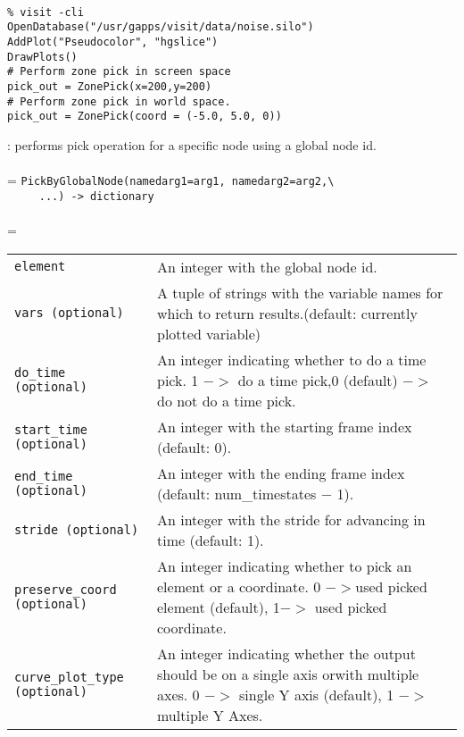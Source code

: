\documentclass[10pt,a4paper]{report}
\begin{document}
\\[-6mm]
\begin{verbatim}% visit -cli
OpenDatabase("/usr/gapps/visit/data/noise.silo")
AddPlot("Pseudocolor", "hgslice")
DrawPlots()
# Perform zone pick in screen space
pick_out = ZonePick(x=200,y=200)
# Perform zone pick in world space.
pick_out = ZonePick(coord = (-5.0, 5.0, 0))
\end{verbatim}
\newpage


{}
: performs pick operation for a specific node using a global node id.\\[-3mm]

 \\ 
\hangindent=\parindent
\verb!PickByGlobalNode(namedarg1=arg1, namedarg2=arg2,\ ! \\ 
\verb!     ...) -> dictionary!\\ [-3mm]

 \\ 
\hangindent=\parindent 
\begin{tabular}{lp{9cm}}
\verb!element! & An integer with the global node id. \\
\verb!vars (optional)! & A tuple of strings with the variable names for which to return results.(default: currently plotted variable) \\
\verb!do_time (optional)! & An integer indicating whether to do a time pick. 1 $-$$>$ do a time pick,0 (default) $-$$>$ do not do a time pick. \\
\verb!start_time (optional)! & An integer with the starting frame index (default: 0). \\
\verb!end_time (optional)! & An integer with the ending frame index (default: num\_timestates $-$ 1). \\
\verb!stride (optional)! & An integer with the stride for advancing in time (default: 1). \\
\verb!preserve_coord (optional)! & An integer indicating whether to pick an element or a coordinate. 0 $-$$>$used picked element (default), 1$-$$>$ used picked coordinate. \\
\verb!curve_plot_type (optional)! & An integer indicating whether the output should be on a single axis orwith multiple axes. 0 $-$$>$ single Y axis (default), 1 $-$$>$ multiple Y Axes. \\
\end{tabular} \\[-2mm]
\end{document}

